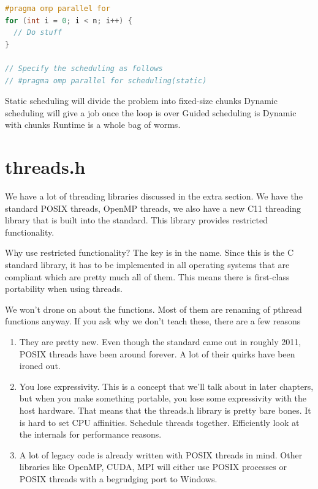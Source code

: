 \begin{lstlisting}[language=C]
#pragma omp parallel for
for (int i = 0; i < n; i++) {
  // Do stuff
}

// Specify the scheduling as follows
// #pragma omp parallel for scheduling(static)
\end{lstlisting}

Static scheduling will divide the problem into fixed-size chunks
Dynamic scheduling will give a job once the loop is over
Guided scheduling is Dynamic with chunks
Runtime is a whole bag of worms.

\section{threads.h}

We have a lot of threading libraries discussed in the extra section.
We have the standard POSIX threads, OpenMP threads, we also have a new C11 threading library that is built into the standard.
This library provides restricted functionality.

Why use restricted functionality?
The key is in the name.
Since this is the C standard library, it has to be implemented in all operating systems that are compliant which are pretty much all of them.
This means there is first-class portability when using threads.

We won't drone on about the functions.
Most of them are renaming of pthread functions anyway.
If you ask why we don't teach these, there are a few reasons

\begin{enumerate}
\item They are pretty new. Even though the standard came out in roughly 2011, POSIX threads have been around forever.
  A lot of their quirks have been ironed out.
\item You lose expressivity.
  This is a concept that we'll talk about in later chapters, but when you make something portable, you lose some expressivity with the host hardware.
  That means that the threads.h library is pretty bare bones.
  It is hard to set CPU affinities.
  Schedule threads together.
  Efficiently look at the internals for performance reasons.
\item A lot of legacy code is already written with POSIX threads in mind.
  Other libraries like OpenMP, CUDA, MPI will either use POSIX processes or POSIX threads with a begrudging port to Windows.
\end{enumerate}

